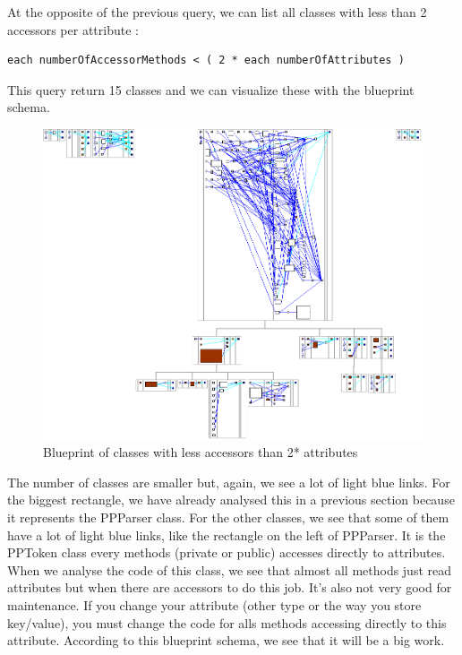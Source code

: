 At the opposite of the previous query, we can list all classes with less than 2 accessors per attribute : 
\begin{lstlisting}
each numberOfAccessorMethods < ( 2 * each numberOfAttributes ) 
\end{lstlisting}
This query return 15 classes and we can visualize these with the blueprint schema.\\
\begin{figure}[ht]
\centering
\label{less_access_blueprint}
\includegraphics[scale=0.35]{less_access_blueprint.png}
\caption{Blueprint of classes with less accessors than 2* attributes}
\end{figure}
The number of classes are smaller but, again, we see a lot of light blue links.  For the biggest rectangle, we have already analysed this in a previous section because it represents the PPParser class.  For the other classes, we see that some of them have a lot of light blue links, like the rectangle on the left of PPParser.  It is the PPToken class every methods (private or public) accesses directly to attributes.  When we analyse the code of this class, we see that almost all methods just read attributes but when there are accessors to do this job.  It's also not very good for maintenance.  If you change your attribute (other type or the way you store key/value), you must change the code for alls methods accessing directly to this attribute. According to this blueprint schema, we  see that it will be a big work.
